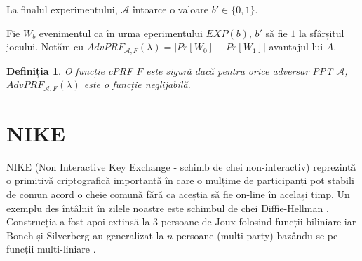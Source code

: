 \documentclass[oneside, 12pt]{book}
\newtheorem{definitie}{\textbf{Definiția}}[section]
\begin{document}
La finalul experimentului, $\mathcal{A}$ întoarce o valoare $b' \in \{0, 1\}$.

Fie $W_b$ evenimentul ca în urma eperimentului $EXP(b)$, $b'$ să fie $1$ la sfârșitul jocului. Notăm cu $AdvPRF_{\mathcal{A},F}(\lambda) = |Pr[W_0] - Pr[W_1]|$ avantajul lui $A$.
\mbox{}\\
\begin{definitie}
	O funcție cPRF $F$ este sigură dacă pentru orice adversar PPT $\mathcal{A}$, $AdvPRF_{\mathcal{A},F}(\lambda)$ este o funcție neglijabilă.
\end{definitie}



\chapter{NIKE}
\label{cha:nike}

NIKE (Non Interactive Key Exchange - schimb de chei non-interactiv) reprezintă o primitivă criptografică importantă în care o mulțime de participanți pot stabili de comun acord o cheie comună fără ca aceștia să fie on-line în același timp. Un exemplu des întâlnit în zilele noastre este schimbul de chei Diffie-Hellman \cite{diffie1976new}. Construcția a fost apoi extinsă la $3$ persoane de Joux folosind funcții biliniare \cite{joux2000one} iar Boneh și Silverberg au generalizat la $n$ persoane (multi-party) bazându-se pe funcții multi-liniare \cite{boneh:2003applications}.
\end{document}
